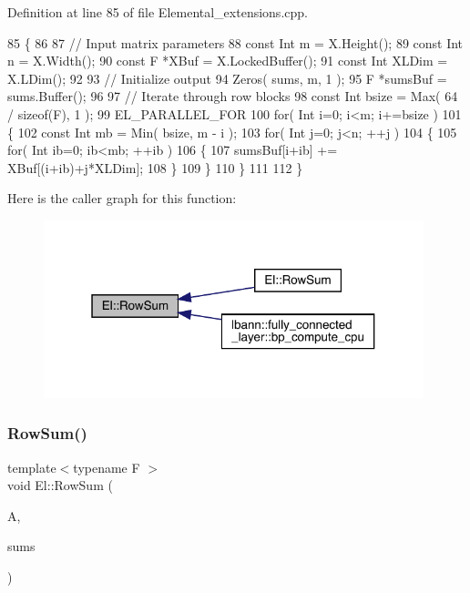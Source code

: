 Definition at line 85 of file Elemental\+\_\+extensions.\+cpp.


\begin{DoxyCode}
85                                                  \{
86 
87     \textcolor{comment}{// Input matrix parameters}
88     \textcolor{keyword}{const} Int m = X.Height();
89     \textcolor{keyword}{const} Int n = X.Width();
90     \textcolor{keyword}{const} F *XBuf = X.LockedBuffer();
91     \textcolor{keyword}{const} Int XLDim = X.LDim();
92 
93     \textcolor{comment}{// Initialize output}
94     Zeros( sums, m, 1 );
95     F *sumsBuf = sums.Buffer();
96 
97     \textcolor{comment}{// Iterate through row blocks}
98     \textcolor{keyword}{const} Int bsize = Max( 64 / \textcolor{keyword}{sizeof}(F), 1 );
99     EL\_PARALLEL\_FOR
100     \textcolor{keywordflow}{for}( Int i=0; i<m; i+=bsize )
101     \{
102         \textcolor{keyword}{const} Int mb = Min( bsize, m - i );
103         \textcolor{keywordflow}{for}( Int j=0; j<n; ++j )
104         \{
105             \textcolor{keywordflow}{for}( Int ib=0; ib<mb; ++ib )
106             \{
107                 sumsBuf[i+ib] += XBuf[(i+ib)+j*XLDim];
108             \}
109         \}
110     \}
111 
112 \}
\end{DoxyCode}
Here is the caller graph for this function\+:\nopagebreak
\begin{figure}[H]
\begin{center}
\leavevmode
\includegraphics[width=313pt]{namespaceEl_a584f088a3325a8222d4d6ac37be04b04_icgraph}
\end{center}
\end{figure}
\mbox{\label{namespaceEl_a3982e90cd0f7cbfdc0f19741ce254c1a}} 
\subsubsection{\texorpdfstring{Row\+Sum()}{RowSum()}\hspace{0.1cm}{\footnotesize\ttfamily [2/2]}}
{\footnotesize\ttfamily template$<$typename F $>$ \\
void El\+::\+Row\+Sum (\begin{DoxyParamCaption}\item[{const Abstract\+Dist\+Matrix$<$ F $>$ \&}]{A,  }\item[{Abstract\+Dist\+Matrix$<$ F $>$ \&}]{sums }\end{DoxyParamCaption})}



